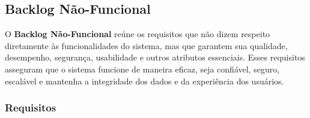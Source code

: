 \renewcommand{\arraystretch}{1.2} %

\subsection{Backlog Não-Funcional}

O \textbf{Backlog Não-Funcional} reúne os requisitos que não dizem respeito diretamente às funcionalidades do sistema, mas que garantem sua qualidade, desempenho, segurança, usabilidade e outros atributos essenciais. Esses requisitos asseguram que o sistema funcione de maneira eficaz, seja confiável, seguro, escalável e mantenha a integridade dos dados e da experiência dos usuários.

\subsubsection*{Requisitos}

